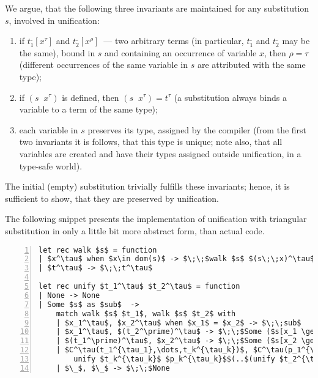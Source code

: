 \documentclass[10pt, oneside, nocopyrightspace]{sigplanconf}
\begin{document}
We argue, that the following three invariants are maintained for any substitution $s$, involved 
in unification:

\begin{enumerate}
\item if \mbox{$t_1^{\_}[x^{\tau}]$} and \mbox{$t_2^{\_}[x^{\rho}]$}~--- two arbitrary terms (in particular, 
$t_1^{\_}$ and $t_2^{\_}$ may be the same), bound in $s$ and containing an occurrence of variable $x$, 
then $\rho=\tau$ (different occurrences of the same variable in $s$ are attributed with the same type);

\item if \mbox{$(s\;\;x^\tau)$} is defined, then \mbox{$(s\;\;x^\tau) = t^\tau$} (a substitution always
binds a variable to a term of the same type);

\item each variable in $s$ preserves its type, assigned by the compiler (from the first two invariants 
it is follows, that this type is unique; note also, that all variables are created and have their 
types assigned outside unification, in a type-safe world).
\end{enumerate}

The initial (empty) substitution trivially fulfills these invariants; hence, it is sufficient
to show, that they are preserved by unification.

The following snippet presents the implementation of unification with triangular 
substitution in only a little bit more abstract form, than actual code. 

\begin{lstlisting}[mathescape=true,numbers=left,numberstyle=\tiny,stepnumber=1,numbersep=5pt]
let rec walk $s$ = function
| $x^\tau$ when $x\in dom(s)$ -> $\;\;$walk $s$ $(s\;\;x)^\tau$
| $t^\tau$ -> $\;\;t^\tau$

let rec unify $t_1^\tau$ $t_2^\tau$ = function
| None -> None
| Some $s$ as $sub$  ->
    match walk $s$ $t_1$, walk $s$ $t_2$ with
    | $x_1^\tau$, $x_2^\tau$ when $x_1$ = $x_2$ -> $\;\;sub$
    | $x_1^\tau$, $(t_2^\prime)^\tau$ -> $\;\;$Some ($s[x_1 \gets t_2^\prime]$)
    | $(t_1^\prime)^\tau$, $x_2^\tau$ -> $\;\;$Some ($s[x_2 \gets t_1^\prime]$)
    | $C^\tau(t_1^{\tau_1},\dots,t_k^{\tau_k})$, $C^\tau(p_1^{\tau_1},\dots,p_k^{\tau_k})$ -> 
        unify $t_k^{\tau_k}$ $p_k^{\tau_k}$$(..$(unify $t_2^{\tau_2}$ $p_2^{\tau_2}$ (unify $t_1^{\tau_1}$ $p_1^{\tau_1}$ $sub$))$..$)
    | $\_$, $\_$ -> $\;\;$None
\end{lstlisting}
\end{document}
